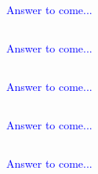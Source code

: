 \documentclass[a4paper,12pt]{article}
\begin{document}
\subsection{}

\textcolor{blue}{
Answer to come...
}
\subsection{}

\textcolor{blue}{
Answer to come...
}
\subsection{}

\textcolor{blue}{
Answer to come...
}
\subsection{}

\textcolor{blue}{
Answer to come...
}
\subsection{}

\textcolor{blue}{
Answer to come...
}
\end{document}
